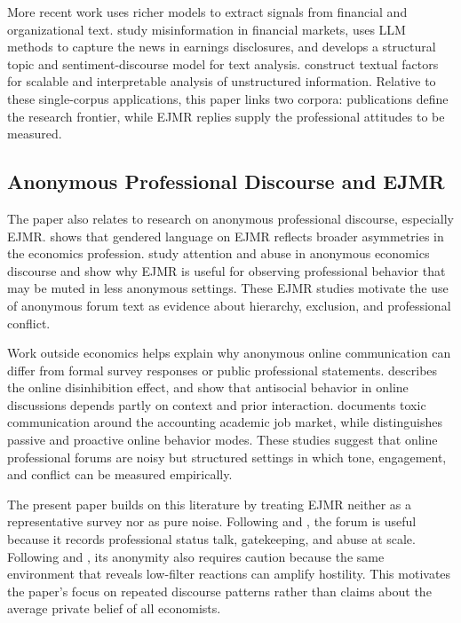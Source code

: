 \documentclass[11pt]{article}
\begin{document}
More recent work uses richer models to extract signals from financial and organizational text. \citet{fan2024} study misinformation in financial markets, \citet{siano2025} uses LLM methods to capture the news in earnings disclosures, and \citet{li2024} develops a structural topic and sentiment-discourse model for text analysis. \citet{lin2024} construct textual factors for scalable and interpretable analysis of unstructured information. Relative to these single-corpus applications, this paper links two corpora: publications define the research frontier, while EJMR replies supply the professional attitudes to be measured.

\subsection{Anonymous Professional Discourse and EJMR}

The paper also relates to research on anonymous professional discourse, especially EJMR. \citet{wu2018} shows that gendered language on EJMR reflects broader asymmetries in the economics profession. \citet{ederer2025} study attention and abuse in anonymous economics discourse and show why EJMR is useful for observing professional behavior that may be muted in less anonymous settings. These EJMR studies motivate the use of anonymous forum text as evidence about hierarchy, exclusion, and professional conflict.

Work outside economics helps explain why anonymous online communication can differ from formal survey responses or public professional statements. \citet{suler2004} describes the online disinhibition effect, and \citet{cheng2017} show that antisocial behavior in online discussions depends partly on context and prior interaction. \citet{alberti2024} documents toxic communication around the accounting academic job market, while \citet{flores2023} distinguishes passive and proactive online behavior modes. These studies suggest that online professional forums are noisy but structured settings in which tone, engagement, and conflict can be measured empirically.

The present paper builds on this literature by treating EJMR neither as a representative survey nor as pure noise. Following \citet{wu2018} and \citet{ederer2025}, the forum is useful because it records professional status talk, gatekeeping, and abuse at scale. Following \citet{suler2004} and \citet{cheng2017}, its anonymity also requires caution because the same environment that reveals low-filter reactions can amplify hostility. This motivates the paper's focus on repeated discourse patterns rather than claims about the average private belief of all economists.
\end{document}
